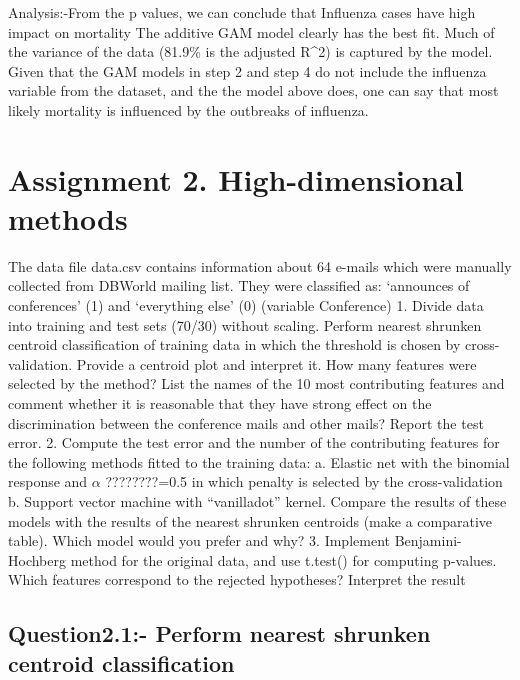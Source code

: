 \documentclass[]{article}
\begin{document}
Analysis:-From the p values, we can conclude that Influenza cases have
high impact on mortality The additive GAM model clearly has the best
fit. Much of the variance of the data (81.9\% is the adjusted R\^{}2) is
captured by the model. Given that the GAM models in step 2 and step 4 do
not include the influenza variable from the dataset, and the the model
above does, one can say that most likely mortality is influenced by the
outbreaks of influenza.

\section{Assignment 2. High-dimensional
methods}\label{assignment-2.-high-dimensional-methods}

The data file data.csv contains information about 64 e-mails which were
manually collected from DBWorld mailing list. They were classified as:
`announces of conferences' (1) and `everything else' (0) (variable
Conference) 1. Divide data into training and test sets (70/30) without
scaling. Perform nearest shrunken centroid classification of training
data in which the threshold is chosen by cross-validation. Provide a
centroid plot and interpret it. How many features were selected by the
method? List the names of the 10 most contributing features and comment
whether it is reasonable that they have strong effect on the
discrimination between the conference mails and other mails? Report the
test error. 2. Compute the test error and the number of the contributing
features for the following methods fitted to the training data: a.
Elastic net with the binomial response and \(\alpha\) ????????=0.5 in
which penalty is selected by the cross-validation b. Support vector
machine with ``vanilladot'' kernel. Compare the results of these models
with the results of the nearest shrunken centroids (make a comparative
table). Which model would you prefer and why? 3. Implement
Benjamini-Hochberg method for the original data, and use t.test() for
computing p-values. Which features correspond to the rejected
hypotheses? Interpret the result

\subsection{Question2.1:- Perform nearest shrunken centroid
classification}\label{question2.1--perform-nearest-shrunken-centroid-classification}
\end{document}
